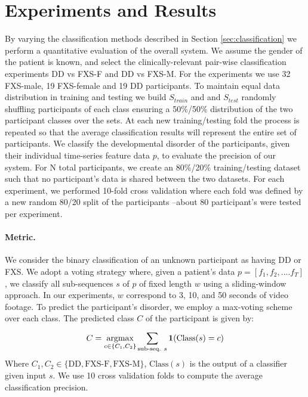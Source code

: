 \documentclass{llncs}
\begin{document}
\section{Experiments and Results}
\vspace*{-\baselineskip}
By varying the classification methods described in Section \ref{sec:classification} we perform a quantitative evaluation of the overall system.
We assume the gender of the patient is known, and select the clinically-relevant pair-wise classification experiments DD vs FXS-F and DD vs FXS-M. For the experiments we use 32 FXS-male, 19 FXS-female and 19 DD participants. To maintain equal data distribution in training and testing we build $S_{train}$ and and $S_{test}$ randomly shuffling participants of each class ensuring a 50\%/50\% distribution of the two participant classes over the sets. At each new training/testing fold the process is repeated so that the average classification results will represent the entire set of participants. We classify the developmental disorder of the participants, given their individual time-series feature data $p$, to evaluate the precision of our system. For N total participants, we create an 80\%/20\% training/testing dataset such that no participant's data is shared between the two datasets. For each experiment, we performed 10-fold cross validation where each fold was defined by a new random 80/20 split of the participants --about 80 participant's were tested per experiment. %
  \vspace*{-\baselineskip}

\paragraph{Metric.}
We consider the binary classification of an unknown participant as having DD or FXS. We adopt a voting strategy where, given a patient's data $p=[f_1, f_2,....f_{T}]$, we classify all sub-sequences $s$ of $p$ of fixed length $w$ using a sliding-window approach. In our experiments, $w$ correspond to 3, 10, and 50 seconds of video footage. To predict the participant's disorder, we employ a max-voting scheme over each class. The predicted class $C$ of the participant is given by:
  \begin{equation}
    C = \underset{c \in \{C_1, C_2\}} {\operatorname{argmax}} \sum_{\text{sub-seq. } s}^{} \bold{1}(\text{Class}(s) = c)
  \end{equation}
  Where $C_1, C_2 \in \{\text{DD}, \text{FXS-F}, \text{FXS-M}\}$, $\text{Class}(s)$ is the output of a classifier given input $s$. We use 10 cross validation folds to compute the average classification precision.
\vspace*{-\baselineskip}
\end{document}
